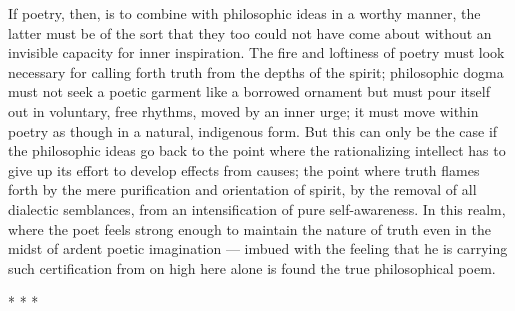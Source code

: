 \begin{quotationx}
If poetry, then, is to combine with philosophic ideas in a worthy manner, the latter must be of the sort that they too could not have come about without an invisible capacity for inner inspiration. The fire and loftiness of poetry must look necessary for calling forth truth from the depths of the spirit; philosophic dogma must not seek a poetic garment like a borrowed ornament but must pour itself out in voluntary, free rhythms, moved by an inner urge; it must move within poetry as though in a natural, indigenous form. But this can only be the case if the philosophic ideas go back to the point where the rationalizing intellect has to give up its effort to develop effects from causes; the point where truth flames forth by the mere purification and orientation of spirit, by the removal of all dialectic semblances, from an intensification of pure self-awareness. In this realm, where the poet feels strong enough to maintain the nature of truth even in the midst of ardent poetic imagination --- imbued with the feeling that he is carrying such certification from on high here alone is found the true philosophical poem.
\end{quotationx}




\begin{center}* * *\end{center}


